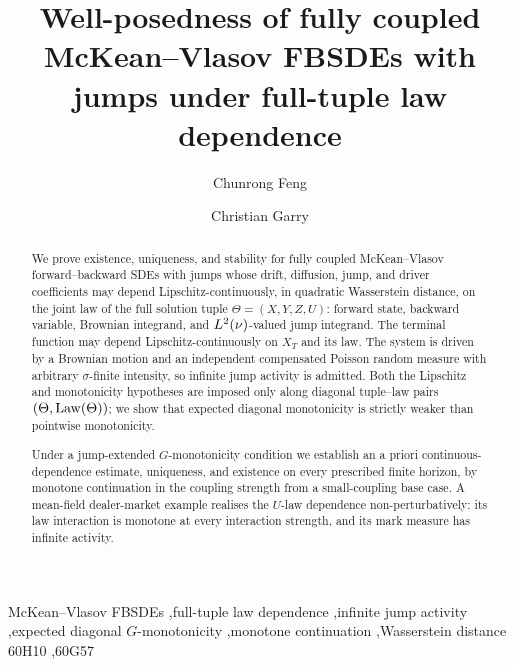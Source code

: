 \documentclass[preprint,12pt]{elsarticle}
\begin{document}
\begin{frontmatter}
\title{Well-posedness of fully coupled McKean--Vlasov FBSDEs with jumps under full-tuple law dependence}

\author[durham]{Chunrong Feng}
\ead{\PaperEmailFeng}
\author[durham]{Christian Garry}
\ead{\PaperEmailGarry}

\begin{abstract}
We prove existence, uniqueness, and stability for fully coupled McKean--Vlasov
forward--backward SDEs with jumps whose drift, diffusion, jump, and driver coefficients
may depend Lipschitz-continuously, in quadratic Wasserstein distance, on the joint law of
the full solution tuple $\Theta=(X,Y,Z,U)$: forward state, backward variable, Brownian
integrand, and $L^2(\nu)$-valued jump integrand. The terminal function may depend
Lipschitz-continuously on $X_T$ and its law. The system is driven by a Brownian motion and an independent compensated Poisson
random measure with arbitrary $\sigma$-finite intensity, so infinite jump activity is
admitted.
Both the Lipschitz and monotonicity hypotheses are imposed only along diagonal
tuple--law pairs $(\Theta,\mathrm{Law}(\Theta))$; we show that expected diagonal monotonicity is
strictly weaker than pointwise monotonicity.

Under a jump-extended $G$-monotonicity condition we
establish an a priori continuous-dependence estimate, uniqueness, and existence on every
prescribed finite horizon, by monotone continuation in the coupling strength from a
small-coupling base case. A mean-field dealer-market example realises the $U$-law
dependence non-perturbatively: its law interaction is monotone at every interaction
strength, and its mark measure has infinite activity.
\end{abstract}

\begin{keyword}
McKean--Vlasov FBSDEs \sep full-tuple law dependence \sep infinite jump activity
\sep expected diagonal \texorpdfstring{$G$}{G}-monotonicity \sep monotone continuation
\sep Wasserstein distance
\MSC[2020] 60H10 \sep 60G57
\end{keyword}

\end{frontmatter}










\end{document}
